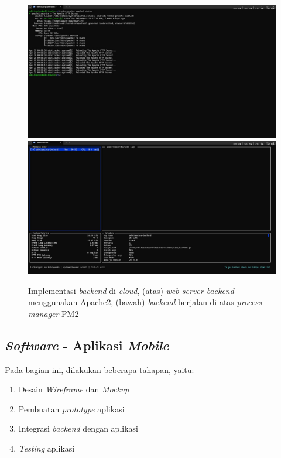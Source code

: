 \begin{figure}[htbp]
  \centering

  \includegraphics[scale=0.47]{gambar/bab3-implementasi-backend.jpeg}
  \includegraphics[scale=0.47]{gambar/bab3-implementasi-backend-2.jpeg}

  \caption{\centering Implementasi \emph{backend} di \emph{cloud}, (atas) \emph{web server backend} menggunakan Apache2, (bawah) \emph{backend} berjalan di atas \emph{process manager} PM2}
  \label{fig:implementationbackend}
\end{figure}

\subsection{\emph{Software} - Aplikasi \emph{Mobile}}

Pada bagian ini, dilakukan beberapa tahapan, yaitu:
\begin{enumerate}[nolistsep]
  \item Desain \textit{Wireframe} dan \textit{Mockup}
  \item Pembuatan \emph{prototype} aplikasi
  \item Integrasi \emph{backend} dengan aplikasi
  \item \emph{Testing} aplikasi
\end{enumerate}

